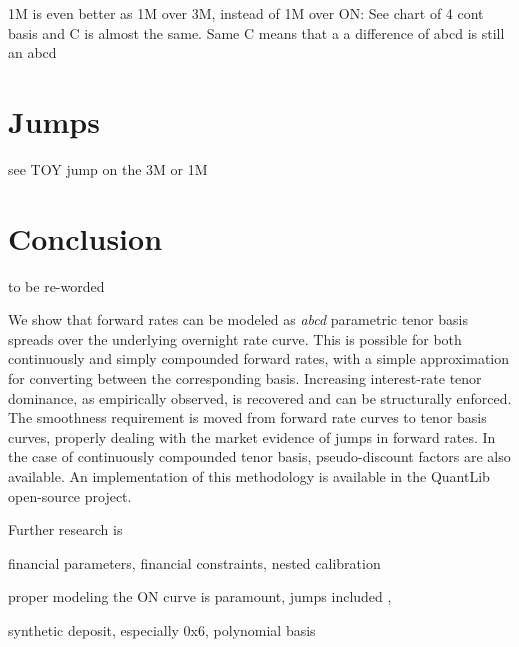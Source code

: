 \documentclass{article}
\begin{document}
1M is even better as 1M over 3M, instead of 1M over ON:  See chart of 4 cont basis and C is almost the same. Same C means that a a difference of abcd is still an abcd



\section{Jumps}

see TOY jump on the 3M or 1M 

\section{Conclusion}

to be re-worded

We show that forward rates can be modeled as \textit{abcd} parametric tenor basis spreads over the underlying overnight rate curve. This is possible for both continuously and simply compounded forward rates, with a simple approximation for converting between the corresponding basis. Increasing interest-rate tenor dominance, as empirically observed, is recovered and can be structurally enforced. The smoothness requirement is moved from forward rate curves to tenor basis curves, properly dealing with the market evidence of jumps in forward rates. In the case of continuously compounded tenor basis, pseudo-discount factors are also available. An implementation of this methodology is available in the QuantLib open-source project.

Further research is 

financial parameters, financial constraints, nested calibration

proper modeling the ON curve is paramount, jumps included \cite{ametrano-mazzocchi}, \cite{ametrano-bertocchi}

synthetic deposit, especially 0x6, polynomial basis
\end{document}
